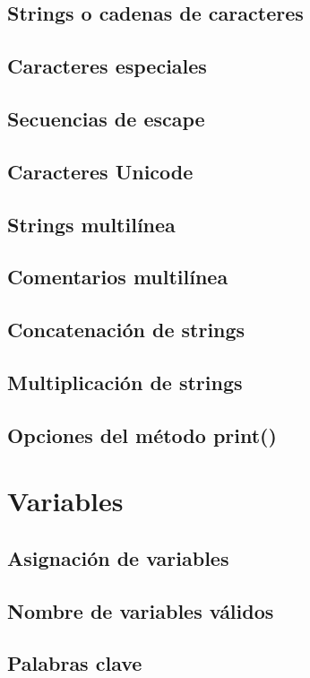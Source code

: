 \documentclass{article}
\begin{document}
      \subsection{Strings o cadenas de caracteres}
      \subsection{Caracteres especiales}
      \subsection{Secuencias de escape}
      \subsection{Caracteres Unicode}
      \subsection{Strings multilínea}
      \subsection{Comentarios multilínea}
      \subsection{Concatenación de strings}
      \subsection{Multiplicación de strings}
      \subsection{Opciones del método print()}
    
    \section{Variables}

      \subsection{Asignación de variables}
      \subsection{Nombre de variables válidos}
      \subsection{Palabras clave}
\end{document}
